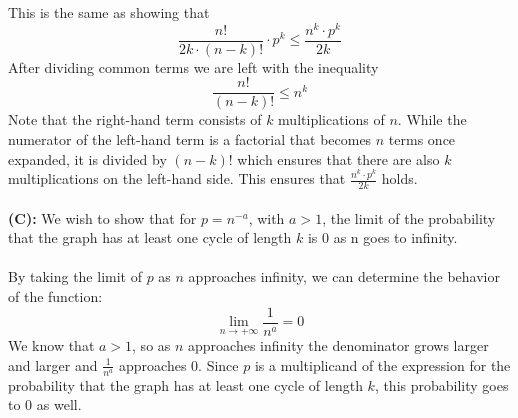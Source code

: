 \documentclass[12pt,letterpaper]{cos340hw}
\begin{document}
This is the same as showing that 
$$\frac{n!}{2k \cdot (n-k)!} \cdot p^k \le \frac{n^k \cdot p^k}{2k}$$
After dividing common terms we are left with the inequality
$$\frac{n!}{(n-k)!} \le n^k$$
Note that the right-hand term consists of $k$ multiplications of $n$. While the numerator of the left-hand term 
is a factorial that becomes $n$ terms once expanded, it is divided by $(n-k)!$ which ensures that there are also 
$k$ multiplications on the left-hand side. This ensures that $\frac{n^k \cdot p^k}{2k}$ holds.\\\\
\noindent\textbf{(C):} We wish to show that for $p=n^{-a}$, with $a > 1$, the limit of the probability that the 
graph has at least one cycle of length $k$ is 0 as n goes to infinity.\\\\
By taking the limit of $p$ as $n$ approaches infinity, we can determine the behavior of the function:
$$\lim_{n \to +\infty} \frac{1}{n^a}=0$$
We know that $a > 1$, so as $n$ approaches infinity the denominator grows larger and larger and 
$\frac{1}{n^a}$ approaches 0. Since $p$ is a multiplicand of the expression for the probability that the graph 
has at least one cycle of length $k$, this probability goes to 0 as well.

\end{document}
